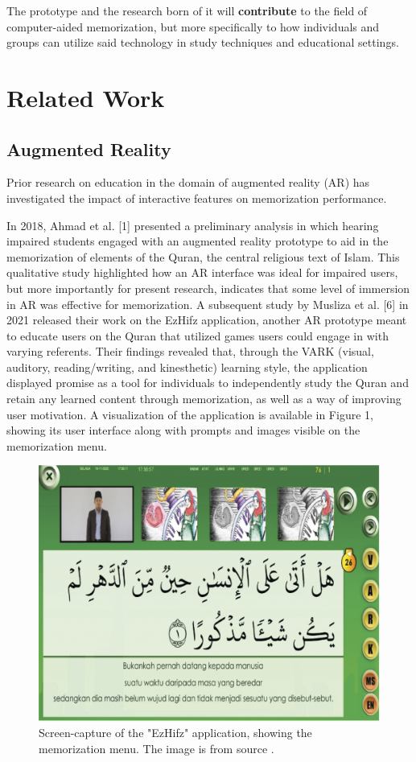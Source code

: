 \documentclass{vgtc}                          %
\begin{document}
The prototype and the research born of it will \textbf{contribute} to the field of computer-aided memorization, but more specifically to how individuals and groups can utilize said technology in study techniques and educational settings.

\section{Related Work}

\subsection{Augmented Reality}

Prior research on education in the domain of augmented reality (AR) has investigated the impact of interactive features on memorization performance.

In 2018, Ahmad et al. [1] presented a preliminary analysis in which hearing impaired students engaged with an augmented reality prototype to aid in the memorization of elements of the Quran, the central religious text of Islam. This qualitative study highlighted how an AR interface was ideal for impaired users, but more importantly for present research, indicates that some level of immersion in AR was effective for memorization. A subsequent study by Musliza et al. [6] in 2021 released their work on the EzHifz application, another AR prototype meant to educate users on the Quran that utilized games users could engage in with varying referents. Their findings revealed that, through the VARK (visual, auditory, reading/writing, and kinesthetic) learning style, the application displayed promise as a tool for individuals to independently study the Quran and retain any learned content through memorization, as well as a way of improving user motivation. A visualization of the application is available in Figure 1, showing its user interface along with prompts and images visible on the memorization menu.

\begin{figure}[tb]
 \centering 
 \includegraphics[width=\linewidth]{ezhifz.png}
 \caption{Screen-capture of the "EzHifz" application, showing the memorization menu. The image is from source \cite{src1}.}
 \label{fig:sample}
\end{figure}
\end{document}
